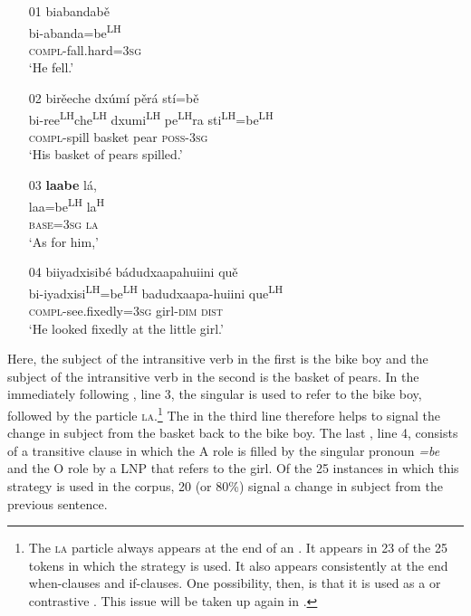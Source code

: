 \ea\label{markedIPR1}
\begin{itemize}
\item[01]
\glll biabandab\v{e} \\
bi-abanda=be\textsuperscript{LH} \\
\textsc{compl}-fall.hard=3\textsc{sg} \\
\glt `He fell.'


\item[02]
\glll bir\v{e}eche dx\'{u}m\'{i} p\v{e}r\'{a} st\'{i}=b\v{e} \\
bi-ree\textsuperscript{LH}che\textsuperscript{LH} dxumi\textsuperscript{LH} pe\textsuperscript{LH}ra sti\textsuperscript{LH}=be\textsuperscript{LH} \\
\textsc{compl}-spill basket pear \textsc{poss}-3\textsc{sg} \\
\glt `His basket of pears spilled.'


\item[03]
\glll \textbf{laabe} l\'{a}, \\
laa=be\textsuperscript{LH} la\textsuperscript{H} \\
\textsc{base}=3\textsc{sg} \textsc{la} \\
\glt `As for him,'


\item[04]
\glll biiyadxisib\'{e} b\'{a}dudxaapahuiini qu\v{e} \\
bi-iyadxisi\textsuperscript{LH}=be\textsuperscript{LH} badudxaapa-huiini que\textsuperscript{LH} \\
\textsc{compl}-see.fixedly=3\textsc{sg} girl-\textsc{dim} \textsc{dist} \\
\glt `He looked fixedly at the little girl.'
\end{itemize}
\z
Here, the subject of the intransitive verb in the first  is the bike boy and the subject of the intransitive verb in the second  is the basket of pears. In the immediately following , line 3, the  singular  is used to refer to the bike boy, followed by the particle \textsc{la}.\footnote{The \textsc{la} particle always appears at the end of an . It appears in 23 of the 25 tokens in which the  strategy is used. It also appears consistently at the end when-clauses and if-clauses. One possibility, then, is that it is used as a  or contrastive . This issue will be taken up again in .} The  in the third line therefore helps to signal the change in subject from the basket back to the bike boy. The last , line 4, consists of a transitive clause in which the A role is filled by the  singular pronoun \textit{=be} and the O role by a LNP that refers to the girl. Of the 25 instances in which this strategy is used in the corpus, 20 (or 80{\%}) signal a change in subject from the previous sentence. 


